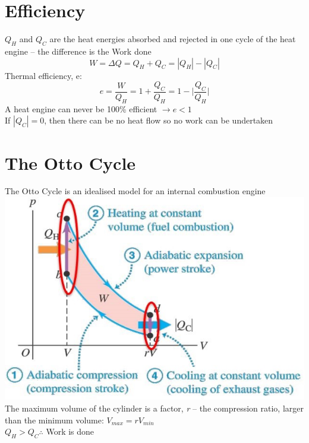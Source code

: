 \documentclass[a4paper, 11pt, normalem]{report}
\begin{document}
\section{Efficiency}
$Q_{H}$ and $Q_{C}$ are the heat energies absorbed and rejected in one cycle of the heat engine -- the difference is the Work done
\begin{equation*}
	W = {\Delta}Q = Q_{H} + Q_{C} = |Q_{H}| - |Q_{C}|
\end{equation*}
Thermal efficiency, e:
\begin{equation*}
	e = \frac{W}{Q_{H}} = 1 + \frac{Q_{C}}{Q_{H}} = 1 - \bigg|\frac{Q_{C}}{Q_{H}}\bigg|
\end{equation*}
A heat engine can never be 100\% efficient $\rightarrow e < 1$ \\
If $|Q_{C}| = 0$, then there can be no heat flow so no work can be undertaken

\section{The Otto Cycle}
The Otto Cycle is an idealised model for an internal combustion engine \\
\includegraphics[scale=0.8]{Otto.jpg} \\
The maximum volume of the cylinder is a factor, \emph{r} -- the compression ratio, larger than the minimum volume: $V_{max} = rV_{min}$ \\
$Q_{H} > Q_{C} \therefore$ Work is done
\end{document}
